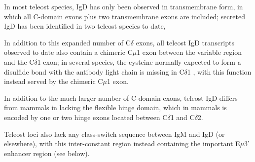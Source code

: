 In most teleost species, IgD has only been observed in transmembrane form, in which all C-domain exons plus two transmembrane exons are included; secreted IgD has been identified in two teleost species to date, %

In addition to this expanded number of C$\delta$ exons, all teleost IgD transcripts observed to date also contain a chimeric C$\mu$1 exon between the variable region and the C$\delta$1 exon; in several species, the cysteine normally expected to form a disulfide bond with the antibody light chain is missing in C$\delta$1 %
, with this function instead served by the chimeric C$\mu$1 exon. %

In addition to the much larger number of C-domain exons, teleost IgD differs from mammals in lacking the flexible hinge domain, which in mammals is encoded by one or two hinge exons located between C$\delta$1 and C$\delta$2. %

Teleost loci also lack any class-switch sequence between IgM and IgD (or elsewhere), with this inter-constant region instead containing the important E$\mu$3' enhancer region (see below).
